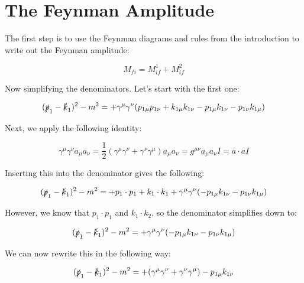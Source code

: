 \documentclass[a4]{article}
\begin{document}
    \section*{The Feynman Amplitude}

    The first step is to use the Feynman diagrams and rules from the introduction to write out the Feynman amplitude:

    \begin{equation}
        M_{fi} = M_{if}^1 + M_{if}^2
    \end{equation}

    Now simplifying the denominators. Let's start with the first one:

    \begin{equation}
        (\slashed{p}_1 - \slashed{k}_1)^2 - m^2 = + \gamma^\mu \gamma^\nu (p_{1 \mu} p_{1 \nu} + k_{1 \mu} k_{1 \nu} - p_{1 \mu} k_{1 \nu} - p_{1 \nu} k_{1 \mu})
    \end{equation}

    Next, we apply the following identity:

    \begin{equation}
        \gamma^\mu \gamma^\nu a_\mu a_\nu = \frac{1}{2} (\gamma^\mu \gamma^\nu + \gamma^\nu \gamma^\mu) a_\mu a_\nu = g^{\mu \nu} a_{\mu} a_{\nu} I = a \cdot a I
    \end{equation}

    Inserting this into the denominator gives the following:

    \begin{equation}
        (\slashed{p}_1 - \slashed{k}_1)^2 - m^2 = + p_1 \cdot p_1 + k_1 \cdot k_1 + \gamma^\mu \gamma^\nu (- p_{1 \mu} k_{1 \nu} - p_{1 \nu} k_{1 \mu})
    \end{equation}

    However, we know that $p_1 \cdot p_1$ and $k_1 \cdot k_2$, so the denominator simplifies down to:

    \begin{equation}
        (\slashed{p}_1 - \slashed{k}_1)^2 - m^2 = + \gamma^\mu \gamma^\nu (- p_{1 \mu} k_{1 \nu} - p_{1 \nu} k_{1 \mu})
    \end{equation}

    We can now rewrite this in the following way:

    \begin{equation}
        (\slashed{p}_1 - \slashed{k}_1)^2 - m^2 = + (\gamma^\mu \gamma^\nu + \gamma^\nu \gamma^\mu) - p_{1 \mu} k_{1 \nu}
    \end{equation}
\end{document}
